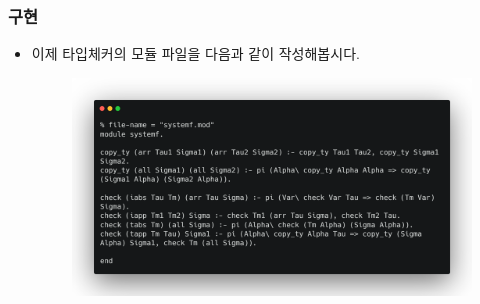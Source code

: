 \documentclass[slidestop,compress,mathserif]{beamer}
\begin{document}
    \begin{frame}
        \frametitle{구현}
        \begin{itemize}
            \item 이제 타입체커의 모듈 파일을 다음과 같이 작성해봅시다.
            \begin{figure}[h]
                \begin{center}
                    \includegraphics[width=1.0\linewidth]{mod.png}
                \end{center}
            \end{figure}
        \end{itemize}
    \end{frame}
\end{document}
